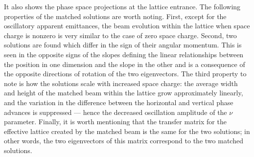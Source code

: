 %
It also shows the phase space projections at the lattice entrance. The following properties of the matched solutions are worth noting. First, except for the oscillatory apparent emittances, the beam evolution within the lattice when space charge is nonzero is very similar to the case of zero space charge. Second, two solutions are found which differ in the sign of their angular momentum. This is seen in the opposite signs of the slopes defining the linear relationships between the position in one dimension and the slope in the other and is a consequence of the opposite directions of rotation of the two eigenvectors. The third property to note is how the solutions scale with increased space charge: the average width and height of the matched beam within the lattice grow approximately linearly, and the variation in the difference between the horizontal and vertical phase advances is suppressed — hence the decreased oscillation amplitude of the $\nu$ parameter. Finally, it is worth mentioning that the transfer matrix for the effective lattice created by the matched beam is the same for the two solutions; in other words, the two eigenvectors of this matrix correspond to the two matched solutions.  

